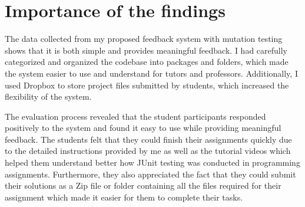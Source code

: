 \section{Importance of the findings}

The data collected from my proposed feedback system with mutation testing shows that it is both simple and provides meaningful feedback. I had carefully categorized and organized the codebase into packages and folders, which made the system easier to use and understand for tutors and professors. Additionally, I used Dropbox to store project files submitted by students, which increased the flexibility of the system. \par

The evaluation process revealed that the student participants responded positively to the system and found it easy to use while providing meaningful feedback. The students felt that they could finish their assignments quickly due to the detailed instructions provided by me as well as the tutorial videos which helped them understand better how JUnit testing was conducted in programming assignments. Furthermore, they also appreciated the fact that they could submit their solutions as a Zip file or folder containing all the files required for their assignment which made it easier for them to complete their tasks. \par

